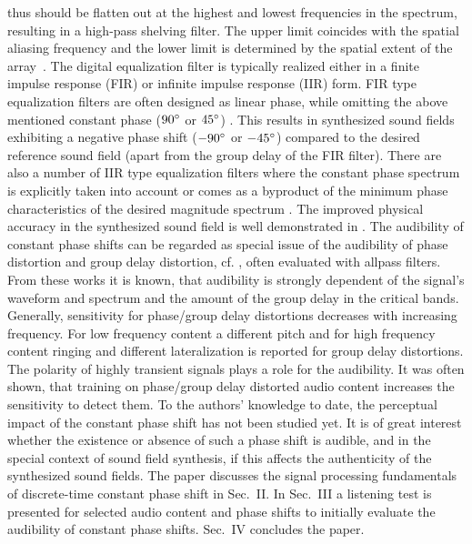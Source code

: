 thus should be flatten out at the highest and lowest frequencies in the spectrum,
resulting in a high-pass shelving filter.
The upper limit coincides with the spatial aliasing frequency
and the lower limit is determined by the spatial extent of the array~\cite{spors2010}.
%
\NewL The digital equalization filter is typically realized either in
a finite impulse response (FIR) or
infinite impulse response (IIR) form.
FIR type equalization filters are often designed as linear phase,
while omitting the above mentioned constant phase ($90\degree$ or $45\degree$)
\cite{wierstorf2014diss, winter2019diss}.
This results in synthesized sound fields exhibiting
a negative phase shift ($-90\degree$ or $-45\degree$)
compared to the desired reference sound field
(apart from the group delay of the FIR filter).
There are also a number of IIR type equalization filters
where the constant phase spectrum is explicitly taken into account
\cite{salvador2010}
or comes as a byproduct of the minimum phase characteristics of the desired
magnitude spectrum \cite{schultz2013daga, schultz2016diss}.
The improved physical accuracy in the synthesized sound field
is well demonstrated in \cite[Fig.~9-11]{schultz2013daga}.
%
\NewL The audibility of constant phase shifts can be regarded as special issue
of the audibility of phase distortion and group delay distortion, cf.
\cite{Hansen1974_1, Hansen1974_2,Blauert1978,Suzuki1980,Lipshitz1982, Moeller2007},
often evaluated with allpass filters.
%
From these works it is known, that audibility is strongly dependent of the
signal's waveform and spectrum and the amount of the group delay in the
critical bands.
%
Generally, sensitivity for phase/group delay distortions decreases with increasing
frequency.
%
For low frequency content a different pitch and for high frequency content
ringing and different lateralization is reported for group delay distortions.
%
The polarity of highly transient signals plays a role for the audibility.
%
It was often shown, that training on phase/group delay distorted audio content
increases the sensitivity to detect them.
%
\NewL To the authors' knowledge to date,
the perceptual impact of the constant phase shift
has not been studied yet.
It is of great interest whether the existence or absence of such a phase shift
is audible, and in the special context of sound field synthesis, if this
affects the authenticity of the synthesized sound fields.
%
The paper discusses the signal processing fundamentals of discrete-time constant
phase shift in Sec.~II.
%
In Sec.~III a listening test is presented for selected audio
content and phase shifts to initially evaluate the audibility of constant phase
shifts.
%
Sec.~IV concludes the paper.
